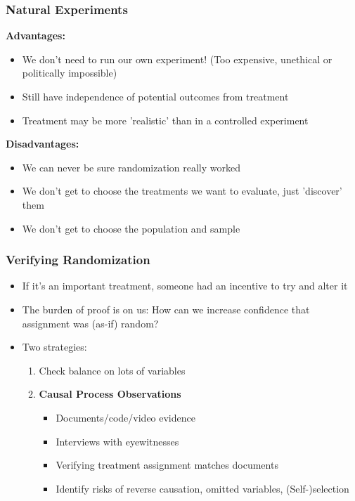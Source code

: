 \documentclass[xcolor=x11names,compress]{beamer}\usepackage[]{graphicx}\usepackage[]{color}
\renewcommand{\(}{\begin{columns}}
\renewcommand{\)}{\end{columns}}
\newcommand{\<}[1]{\begin{column}{#1}}
\renewcommand{\>}{\end{column}}
\begin{document}
\begin{frame}
\frametitle{Natural Experiments}
\begin{multicols}{2}
\item \textbf{Advantages:}
\begin{itemize}
\item We don't need to run our own experiment! (Too expensive, unethical or politically impossible)
\pause
\item Still have independence of potential outcomes from treatment
\pause
\item Treatment may be more 'realistic' than in a controlled experiment
\pause
\end{itemize}
\item \textbf{Disadvantages:}
\begin{itemize}
\item We can never be sure randomization really worked
\pause
\item We don't get to choose the treatments we want to evaluate, just 'discover' them
\pause
\item We don't get to choose the population and sample
\end{itemize}
\columnbreak
\end{multicols}
\end{frame}

\begin{frame}
\frametitle{Verifying Randomization}
\begin{itemize}
\item If it's an important treatment, someone had an incentive to try and alter it
\pause
\item The burden of proof is on us: How can we increase confidence that assignment was (as-if) random?
\pause
\item Two strategies:
\pause
\begin{enumerate}
\item Check balance on lots of variables
\pause
\item \textbf{Causal Process Observations}
\begin{itemize}
\item Documents/code/video evidence
\item Interviews with eyewitnesses
\item Verifying treatment assignment matches documents
\item Identify risks of reverse causation, omitted variables, (Self-)selection
\end{itemize}
\end{enumerate}
\end{itemize}
\end{frame}
\end{document}
